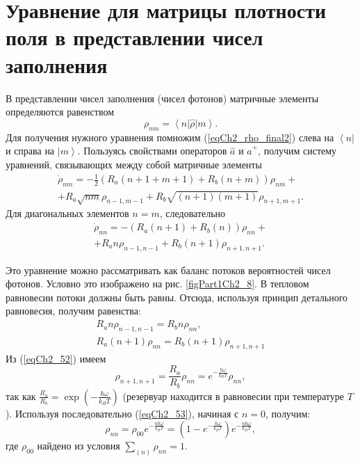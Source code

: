 \section{Уравнение для матрицы плотности поля в представлении чисел
  заполнения}
\label{ch2_7}
В представлении чисел заполнения (чисел фотонов) матричные элементы
определяются равенством
\[
\rho_{nm} = \left<n\right|\hat{\rho}\left|m\right>.
\]
Для получения нужного уравнения помножим
(\ref{eqCh2_rho_final2}) слева на $\left<n\right|$ и справа на  
$\left|m\right>$.  Пользуясь
свойствами операторов $\hat{a}$ и $\hat{a}^{+}$,  получим систему
уравнений, связывающих между собой матричные элементы 
\begin{eqnarray}
\dot{\rho}_{nm} = - \frac{1}{2}
\left(
R_a\left(n + 1 + m + 1\right) + 
R_b\left(n + m\right)
\right)\rho_{nm} +
\nonumber \\
+ 
R_a\sqrt{nm}\rho_{n - 1, m - 1} +
R_b\sqrt{\left(n + 1\right)\left(m + 1\right)}\rho_{n + 1, m + 1}.
\label{eqCh2_task5}
\end{eqnarray}
Для диагональных элементов $n = m$,  следовательно
\begin{eqnarray}
\dot{\rho}_{nn} = - 
\left(
R_a\left(n + 1\right) + 
R_b\left(n\right)
\right)\rho_{nn} +
\nonumber \\
+ 
R_a n \rho_{n - 1, n - 1} +
R_b\left(n + 1\right)\rho_{n + 1, n + 1}.
\label{eqCh2_51}
\end{eqnarray}



Это уравнение можно рассматривать как баланс потоков вероятностей
чисел фотонов. Условно это изображено на рис. \ref{figPart1Ch2_8}. В
тепловом равновесии потоки должны быть равны. Отсюда, используя
принцип детального равновесия, получим равенства: 
\begin{eqnarray}
R_a n \rho_{n - 1, n - 1} = R_b n \rho_{nn},
\nonumber \\
R_a \left(n + 1\right) \rho_{n n} = R_b 
\left(n + 1\right) \rho_{n + 1, n + 1}
\label{eqCh2_52}
\end{eqnarray}
Из (\ref{eqCh2_52}) имеем
\begin{equation}
\rho_{n + 1, n + 1} = \frac{R_a}{R_b}\rho_{nn} = 
e^{-\frac{\hbar \omega}{k_B T}}\rho_{nn},
\label{eqCh2_53}
\end{equation}
так как  
\(
\frac{R_a}{R_b} = 
\exp \left(-\frac{\hbar \omega}{k_B T}\right)
\)
(резервуар находится в равновесии при температуре
$T$). Используя последовательно (\ref{eqCh2_53}), начиная с  $n = 0$, 
получим:  
\begin{equation}
\rho_{nn} = \rho_{00} 
e^{-\frac{n \hbar \omega}{k_B T}} =
\left(1 - e^{-\frac{\hbar \omega}{k_B T}}\right) 
e^{-\frac{n \hbar \omega}{k_B T}},
\end{equation}
где $\rho_{00}$ найдено из условия $\sum_{(n)}\rho_{nn} = 1$.

